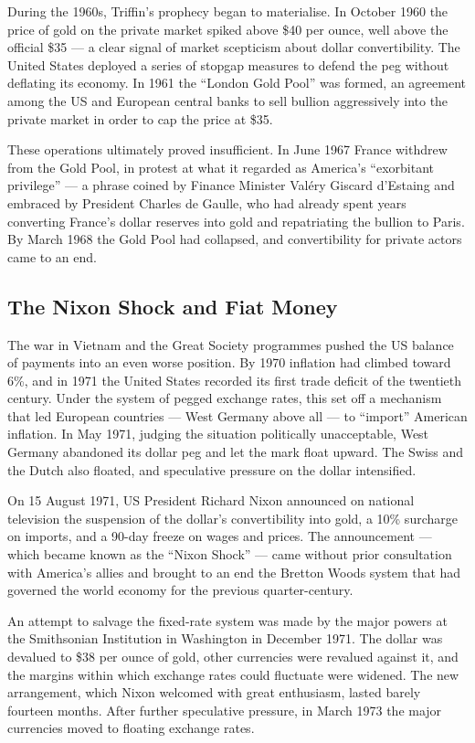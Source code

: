 During the 1960s, Triffin's prophecy began to materialise. In October 1960 the price of gold on the private market spiked above \$40 per ounce, well above the official \$35 --- a clear signal of market scepticism about dollar convertibility. The United States deployed a series of stopgap measures to defend the peg without deflating its economy. In 1961 the ``London Gold Pool'' was formed, an agreement among the US and European central banks to sell bullion aggressively into the private market in order to cap the price at \$35.

These operations ultimately proved insufficient. In June 1967 France withdrew from the Gold Pool, in protest at what it regarded as America's ``exorbitant privilege'' --- a phrase coined by Finance Minister Val{\'e}ry Giscard d'Estaing and embraced by President Charles de Gaulle, who had already spent years converting France's dollar reserves into gold and repatriating the bullion to Paris. By March 1968 the Gold Pool had collapsed, and convertibility for private actors came to an end.
\subsection{The Nixon Shock and Fiat Money}
The war in Vietnam and the Great Society programmes pushed the US balance of payments into an even worse position. By 1970 inflation had climbed toward 6\%, and in 1971 the United States recorded its first trade deficit of the twentieth century. Under the system of pegged exchange rates, this set off a mechanism that led European countries --- West Germany above all --- to ``import'' American inflation. In May 1971, judging the situation politically unacceptable, West Germany abandoned its dollar peg and let the mark float upward. The Swiss and the Dutch also floated, and speculative pressure on the dollar intensified.

On 15 August 1971, US President Richard Nixon announced on national television the suspension of the dollar's convertibility into gold, a 10\% surcharge on imports, and a 90-day freeze on wages and prices. The announcement --- which became known as the ``Nixon Shock'' --- came without prior consultation with America's allies and brought to an end the Bretton Woods system that had governed the world economy for the previous quarter-century.

An attempt to salvage the fixed-rate system was made by the major powers at the Smithsonian Institution in Washington in December 1971. The dollar was devalued to \$38 per ounce of gold, other currencies were revalued against it, and the margins within which exchange rates could fluctuate were widened. The new arrangement, which Nixon welcomed with great enthusiasm, lasted barely fourteen months. After further speculative pressure, in March 1973 the major currencies moved to floating exchange rates.

